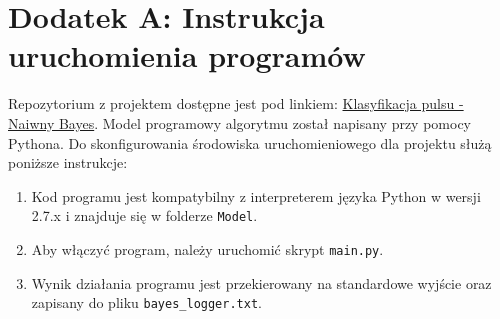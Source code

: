 \section{Dodatek A: Instrukcja uruchomienia programów}
\label{dodatekA}

\qquad Repozytorium z projektem dostępne jest pod linkiem: \href{https://github.com/kamilfocus/ESDMiT-Naive-Bayes}{Klasyfikacja pulsu - Naiwny Bayes}. Model programowy algorytmu został napisany przy pomocy Pythona. Do skonfigurowania środowiska uruchomieniowego dla projektu służą poniższe instrukcje:

\begin{enumerate}
	\item Kod programu jest kompatybilny z interpreterem języka Python w wersji 2.7.x i znajduje się w folderze \texttt{Model}.
	\item Aby włączyć program, należy uruchomić skrypt \texttt{main.py}.
	\item Wynik działania programu jest przekierowany na standardowe wyjście oraz zapisany do pliku \texttt{bayes\_logger.txt}.
\end{enumerate}
